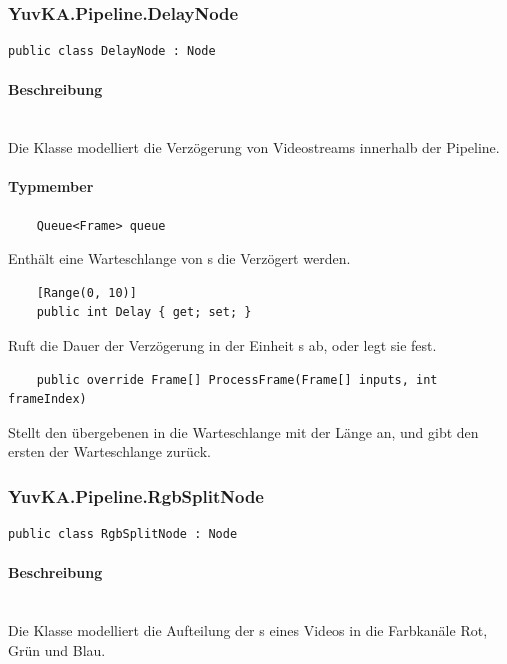 \subsubsection{YuvKA.Pipeline.DelayNode}

\begin{verbatim}
public class DelayNode : Node
\end{verbatim}

\paragraph{Beschreibung}~\\
Die Klasse  modelliert die Verzögerung von Videostreams innerhalb der Pipeline.

\paragraph{Typmember}
\begin{itemize}

	\begin{verbatim}
	Queue<Frame> queue
	\end{verbatim}
	Enthält eine Warteschlange von s die Verzögert werden.
	
	\begin{verbatim}
	[Range(0, 10)]
	public int Delay { get; set; }
	\end{verbatim}
	Ruft die Dauer der Verzögerung in der Einheit s ab, oder legt sie fest.

	\begin{verbatim}
	public override Frame[] ProcessFrame(Frame[] inputs, int frameIndex)
	\end{verbatim}
	Stellt den übergebenen  in die Warteschlange  mit der Länge  an, und gibt den ersten  der Warteschlange zurück.
	
\end{itemize}

\subsubsection{YuvKA.Pipeline.RgbSplitNode}

\begin{verbatim}
public class RgbSplitNode : Node
\end{verbatim}

\paragraph{Beschreibung}~\\
Die Klasse  modelliert die Aufteilung der s eines Videos in die Farbkanäle Rot, Grün und Blau.

